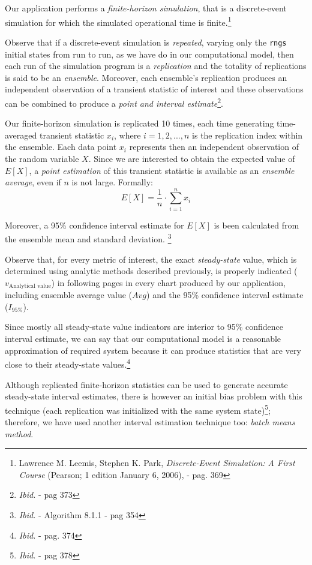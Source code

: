 \documentclass[10pt,a4paper]{article}
\begin{document}
Our application performs a \textit{finite-horizon simulation}, that is a discrete-event simulation for which the simulated operational time is finite.\footnote{Lawrence M. Leemis, Stephen K. Park, \textit{Discrete-Event Simulation: A First Course} (Pearson; 1 edition January 6, 2006), - pag. 369}

Observe that if a discrete-event simulation is \textit{repeated}, varying only the \texttt{rngs} initial states from run to run, as we have do in our computational model, then each run of the simulation program is a \textit{replication} and the totality of replications is said to be an \textit{ensemble}. Moreover, each ensemble's replication produces an independent observation of a transient statistic of interest and these observations can be combined to produce a \textit{point and interval estimate}\footnote{\textit{Ibid.} - pag 373}.

Our finite-horizon simulation is replicated 10 times, each time generating time-averaged transient statistic $x_i$, where $i = 1,2,...,n$ is the replication index within the ensemble. Each data point $x_i$ represents then an independent observation of the random variable $X$. Since we are interested to obtain the expected value of $E[X]$,  a \textit{point estimation} of this transient statistic is available as an \textit{ensemble average}, even if $n$ is not large. Formally:
\begin{equation}
E[X] = \dfrac{1}{n} \cdot \sum_{i=1}^{n} x_i
\end{equation}

Moreover, a 95\% confidence interval estimate for $E[X]$ is been calculated from the ensemble mean and standard deviation. \footnote{\textit{Ibid.} - Algorithm 8.1.1 - pag 354}

Observe that, for every metric of interest, the exact \textit{steady-state} value, which is determined using analytic methods described previously, is properly indicated ($v_{\text{Analytical value}}$) in following pages in every chart produced by our application, including ensemble average value ($Avg$) and the 95\% confidence interval estimate ($I_{95\%}$).

Since mostly all steady-state value indicators are interior to 95\% confidence interval estimate, we can say that our computational model is a reasonable approximation of required system because it can produce statistics that are very close to their steady-state values.\footnote{\textit{Ibid.} - pag. 374}

Although replicated finite-horizon statistics can be used to generate accurate steady-state interval estimates,  there is however an initial bias problem with this technique (each replication was initialized with the same system state)\footnote{\textit{Ibid.} - pag 378}; therefore, we have used another interval estimation technique too: \textit{batch means method}.
\end{document}

